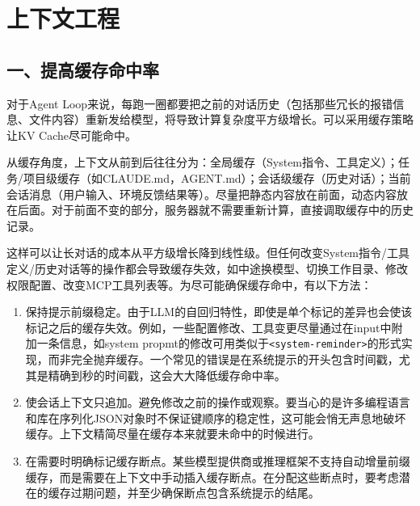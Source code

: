 \setcounter{section}{2}

\hypertarget{ux4e0aux4e0bux6587ux5de5ux7a0b}{%
\section{上下文工程}\label{ux4e0aux4e0bux6587ux5de5ux7a0b}}

\hypertarget{ux4e00ux63d0ux9ad8ux7f13ux5b58ux547dux4e2dux7387}{%
\subsection{一、提高缓存命中率}\label{ux4e00ux63d0ux9ad8ux7f13ux5b58ux547dux4e2dux7387}}

对于Agent Loop来说，每跑一圈都要把之前的对话历史（包括那些冗长的报错信息、文件内容）重新发给模型，将导致计算复杂度平方级增长。可以采用缓存策略让KV Cache尽可能命中。

从缓存角度，上下文从前到后往往分为：全局缓存（System指令、工具定义）；任务/项目级缓存（如CLAUDE.md，AGENT.md）；会话级缓存（历史对话）；当前会话消息（用户输入、环境反馈结果等）。尽量把静态内容放在前面，动态内容放在后面。对于前面不变的部分，服务器就不需要重新计算，直接调取缓存中的历史记录。

这样可以让长对话的成本从平方级增长降到线性级。但任何改变System指令/工具定义/历史对话等的操作都会导致缓存失效，如中途换模型、切换工作目录、修改权限配置、改变MCP工具列表等。为尽可能确保缓存命中，有以下方法：

\begin{enumerate}
\def\labelenumi{\arabic{enumi}.}
\item
  保持提示前缀稳定。由于LLM的自回归特性，即使是单个标记的差异也会使该标记之后的缓存失效。例如，一些配置修改、工具变更尽量通过在input中附加一条信息，如system propmt的修改可用类似于\texttt{\textless{}system-reminder\textgreater{}}的形式实现，而非完全抛弃缓存。一个常见的错误是在系统提示的开头包含时间戳，尤其是精确到秒的时间戳，这会大大降低缓存命中率。
\item
  使会话上下文只追加。避免修改之前的操作或观察。要当心的是许多编程语言和库在序列化JSON对象时不保证键顺序的稳定性，这可能会悄无声息地破坏缓存。上下文精简尽量在缓存本来就要未命中的时候进行。
\item
  在需要时明确标记缓存断点。某些模型提供商或推理框架不支持自动增量前缀缓存，而是需要在上下文中手动插入缓存断点。在分配这些断点时，要考虑潜在的缓存过期问题，并至少确保断点包含系统提示的结尾。
\end{enumerate}


